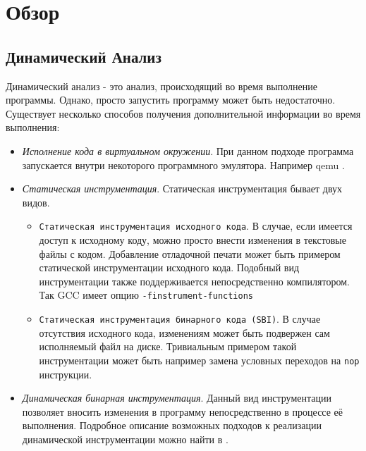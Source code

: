 \chapter{Обзор}


\section{Динамический Анализ}

Динамический анализ - это анализ, происходящий во время выполнение программы. Однако, просто запустить программу может быть недостаточно. Существует несколько способов получения дополнительной информации во время выполнения:

\begin{itemize}
\item {\em Исполнение кода в виртуальном окружении}. При данном подходе программа запускается внутри некоторого программного эмулятора. Например qemu \cite{QEMU}.

\item {\em Статическая инструментация}.
Статическая инструментация бывает двух видов.
    \begin{itemize}
        \item \texttt{Статическая инструментация исходного кода}. В случае, если имеется доступ к исходному коду, можно просто внести изменения в текстовые файлы с кодом. Добавление отладочной печати может быть примером статической инструментации исходного кода. Подобный вид инструментации также поддерживается непосредственно компилятором. Так GCC имеет опцию  \texttt{-finstrument-functions}
        \item \texttt{Статическая инструментация бинарного кода (SBI)}. В случае отсутствия исходного кода, изменениям может быть подвержен сам исполняемый файл на диске. Тривиальным примером такой инструментации может быть например замена условных переходов на \texttt{nop} инструкции. 
    \end{itemize}

\item {\em Динамическая бинарная инструментация}. Данный вид инструментации позволяет вносить изменения в программу непосредственно в процессе её выполнения. Подробное описание возможных подходов к реализации динамической инструментации можно найти в \cite{PBA}.
\end{itemize}

